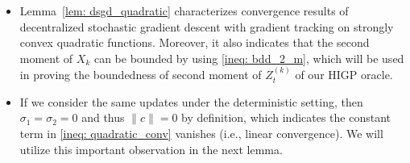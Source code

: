 \documentclass{article}
\theoremstyle{plain}
\theoremstyle{definition}
\theoremstyle{remark}
\begin{document}
\begin{itemize}
    \item Lemma~\ref{lem: dsgd_quadratic} characterizes convergence results of decentralized stochastic gradient descent with gradient tracking on strongly convex quadratic functions. Moreover, it also indicates that the second moment of $X_k$ can be bounded by using \eqref{ineq: bdd_2_m}, which will be used in proving the boundedness of second moment of $Z_t^{(k)}$ of our HIGP oracle.
    
    \item If we consider the same updates under the deterministic setting, then $\sigma_1 = \sigma_2 = 0$ and thus $\|c\|= 0$ by definition, which indicates the constant term in \eqref{ineq: quadratic_conv} vanishes (i.e., linear convergence). We will utilize this important observation in the next lemma.
\end{itemize}
 
\end{document}
